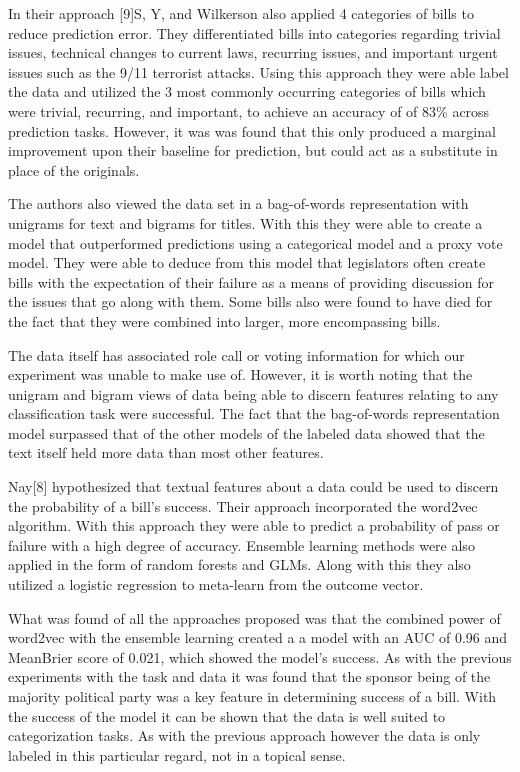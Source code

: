 \documentclass[11pt,a4paper]{article}
\begin{document}
In their approach [9]S, Y, and Wilkerson also applied 4 categories of bills to reduce prediction error. They differentiated bills into categories regarding trivial issues, technical changes to current laws, recurring issues, and important urgent issues such as the 9/11 terrorist attacks. Using this approach they were able label the data and utilized the 3 most commonly occurring categories of bills which were trivial, recurring, and important, to achieve an accuracy of of 83\% across prediction tasks. However, it was was found that this only produced a marginal improvement upon their baseline for prediction, but could act as a substitute in place of the originals.

The authors also viewed the data set in a bag-of-words representation with unigrams for text and bigrams for titles. With this they were able to create a model that outperformed predictions using a categorical model and a proxy vote model. They were able to deduce from this model that legislators often create bills with the expectation of their failure as a means of providing discussion for the issues that go along with them. Some bills also were found to have died for the fact that they were combined into larger, more encompassing bills.

The data itself has associated role call or voting information for which our experiment was unable to make use of. However, it is worth noting that the unigram and bigram views of data being able to discern features relating to any classification task were successful. The fact that the bag-of-words representation model surpassed that of the other models of the labeled data showed that the text itself held more data than most other features.

Nay[8] hypothesized that textual features about a data could be used to discern the probability of a bill's success. Their approach incorporated the word2vec algorithm. With this approach they were able to predict a probability of pass or failure with a high degree of accuracy. Ensemble learning methods were also applied in the form of random forests and GLMs. Along with this they also utilized a logistic regression to meta-learn from the outcome vector.

What was found of all the approaches proposed was that the combined power of word2vec with the ensemble learning created a a model with an AUC of 0.96 and MeanBrier score of 0.021, which showed the model's success. As with the previous experiments with the task and data it was found that the sponsor being of the majority political party was a key feature in determining success of a bill. With the success of the model it can be shown that the data is well suited to categorization tasks. As with the previous approach however the data is only labeled in this particular regard, not in a topical sense.
\end{document}
